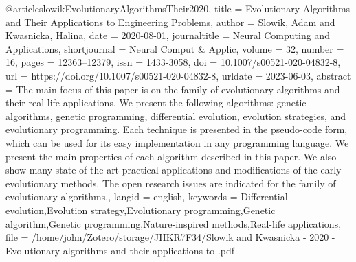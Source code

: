 \begin{thebibliography}
@article{slowikEvolutionaryAlgorithmsTheir2020,
  title = {Evolutionary Algorithms and Their Applications to Engineering Problems},
  author = {Slowik, Adam and Kwasnicka, Halina},
  date = {2020-08-01},
  journaltitle = {Neural Computing and Applications},
  shortjournal = {Neural Comput \& Applic},
  volume = {32},
  number = {16},
  pages = {12363--12379},
  issn = {1433-3058},
  doi = {10.1007/s00521-020-04832-8},
  url = {https://doi.org/10.1007/s00521-020-04832-8},
  urldate = {2023-06-03},
  abstract = {The main focus of this paper is on the family of evolutionary algorithms and their real-life applications. We present the following algorithms: genetic algorithms, genetic programming, differential evolution, evolution strategies, and evolutionary programming. Each technique is presented in the pseudo-code form, which can be used for its easy implementation in any programming language. We present the main properties of each algorithm described in this paper. We also show many state-of-the-art practical applications and modifications of the early evolutionary methods. The open research issues are indicated for the family of evolutionary algorithms.},
  langid = {english},
  keywords = {Differential evolution,Evolution strategy,Evolutionary programming,Genetic algorithm,Genetic programming,Nature-inspired methods,Real-life applications},
  file = {/home/john/Zotero/storage/JHKR7F34/Slowik and Kwasnicka - 2020 - Evolutionary algorithms and their applications to .pdf}
}


\end{thebibliography}
